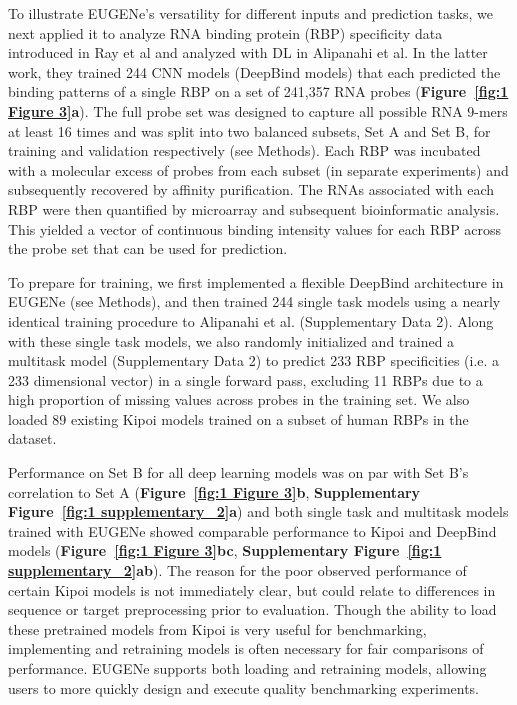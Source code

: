 To illustrate EUGENe’s versatility for different inputs and prediction tasks, we next applied it to analyze RNA binding protein (RBP) specificity data introduced in Ray et al\cite{Ray2013-yd} and analyzed with DL in Alipanahi et al\cite{Alipanahi2015-ef}. In the latter work, they trained 244 CNN models (DeepBind models) that each predicted the binding patterns of a single RBP on a set of 241,357 RNA probes (\textbf{Figure~\ref{fig:1 Figure 3}a}). The full probe set was designed to capture all possible RNA 9-mers at least 16 times and was split into two balanced subsets, Set A and Set B, for training and validation respectively (see Methods)\cite{Ray2013-yd}. Each RBP was incubated with a molecular excess of probes from each subset (in separate experiments) and subsequently recovered by affinity purification. The RNAs associated with each RBP were then quantified by microarray and subsequent bioinformatic analysis\cite{Berger2009-la}. This yielded a vector of continuous binding intensity values for each RBP across the probe set that can be used for prediction.

To prepare for training, we first implemented a flexible DeepBind architecture in EUGENe (see Methods), and then trained 244 single task models using a nearly identical training procedure to Alipanahi et al. (Supplementary Data 2). Along with these single task models, we also randomly initialized and trained a multitask model (Supplementary Data 2) to predict 233 RBP specificities (i.e. a 233 dimensional vector) in a single forward pass, excluding 11 RBPs due to a high proportion of missing values across probes in the training set. We also loaded 89 existing Kipoi\cite{Avsec2019-ke} models trained on a subset of human RBPs in the dataset.

Performance on Set B for all deep learning models was on par with Set B’s correlation to Set A (\textbf{Figure~\ref{fig:1 Figure 3}b}, \textbf{Supplementary Figure~\ref{fig:1 supplementary_2}a}) and both single task and multitask models trained with EUGENe showed comparable performance to Kipoi and DeepBind models (\textbf{Figure~\ref{fig:1 Figure 3}b}\textbf{c}, \textbf{Supplementary Figure~\ref{fig:1 supplementary_2}a}\textbf{b}). The reason for the poor observed performance of certain Kipoi models is not immediately clear, but could relate to differences in sequence or target preprocessing prior to evaluation. Though the ability to load these pretrained models from Kipoi is very useful for benchmarking, implementing and retraining models is often necessary for fair comparisons of performance. EUGENe supports both loading and retraining models, allowing users to more quickly design and execute quality benchmarking experiments. 

